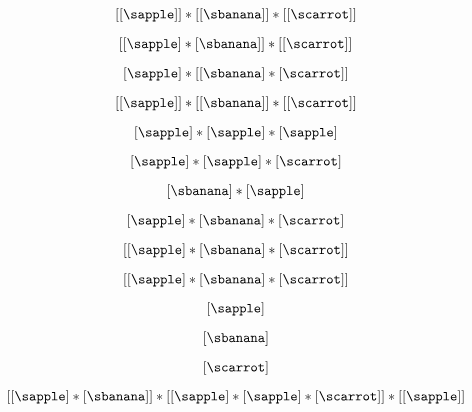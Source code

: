 {\begin{forslides}
\begin{equation}\label{eq:fruit-sum-7}
 [ [ \sapple ] ] * [[ \sbanana ] ]  *  [[\scarrot]]
\end{equation}

\begin{equation}\label{eq:fruit-sum-7'}
 [ [ \sapple ]  * [ \sbanana ] ] *  [[\scarrot]]
\end{equation}

\begin{equation}\label{eq:fruit-sum-8}
 [ \sapple ]   *  [[ \sbanana ]  * [ \scarrot ]]
\end{equation}

\begin{equation}\label{eq:fruit-sum-9}
 [[ \sapple ]]  * [[ \sbanana ]] *  [[ \scarrot ]]
\end{equation}


\begin{equation}\label{eq:fruit-sum-10}
 [ \sapple ]   *  [ \sapple ]  *  [\sapple]  
\end{equation}

\begin{equation}\label{eq:fruit-sum-11}
 [ \sapple ]   *  [ \sapple ]  * [ \scarrot ]
\end{equation}

\begin{equation}\label{eq:fruit-sum-12}
[\sbanana ] * [ \sapple ]   
\end{equation}

\begin{equation}\label{eq:fruit-sum-13}
 [ \sapple ]   *  [ \sbanana ]  *  [ \scarrot ] 
\end{equation}

\begin{equation}\label{eq:fruit-sum-14}
[ [ \sapple ]   *  [ \sbanana ]  *  [ \scarrot ] ]
\end{equation}

\begin{equation}\label{eq:fruit-sum-15}
 [ [ \sapple ]  *  [\sbanana]  *  [\scarrot ]  ]
\end{equation}

\begin{equation}\label{eq:fruit-sum-16}
 [ \sapple ] 
\end{equation}

\begin{equation}\label{eq:fruit-sum-17}
 [ \sbanana ] 
\end{equation}

\begin{equation}\label{eq:fruit-sum-18}
 [ \scarrot ] 
\end{equation}

\begin{equation}\label{eq:fruit-sum-20}
 [ [ \sapple ]   * [ \sbanana] ] *  [[ \sapple ]   *  [ \sapple ] *  [\scarrot ] ]   *  [[ \sapple ] ]
\end{equation}



\end{forslides}

}



\begin{exercise}
\end{exercise}
\begin{solution}
\end{solution}

